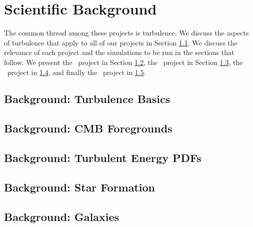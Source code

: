 \section{Scientific Background}
\label{sec.background}

The common thread among these projects is turbulence.  We discuss the aspects of
turbulence that apply to all of our projects in Section
\ref{sec.turbulence}.  We discuss the relevance of each project and the simulations to be run in
the sections that follow.
We present the \nameCMB\ project in Section
\ref{sec.back_foregrounds}, the \nameTurbulence\ project in Section
\ref{sec.back_turb}, the \nameCores\ project in \ref{sec.back_cores}, and
finally the \nameGalaxies\ project in \ref{sec.back_galaxies}.


\subsection{Background: Turbulence Basics}
\label{sec.turbulence}



\subsection{Background: CMB Foregrounds}
\label{sec.back_foregrounds}



\subsection{Background: Turbulent Energy PDFs}
\label{sec.back_turb}



\subsection{Background: Star Formation}
\label{sec.back_cores}



\subsection{Background: Galaxies}
\label{sec.back_galaxies}


